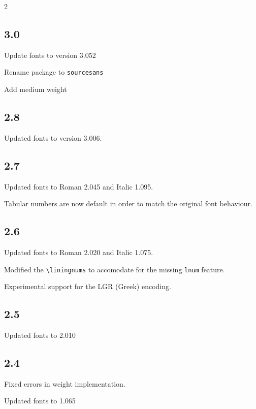\documentclass[10pt,a4paper,english]{article}
\begin{document}
\begin{multicols}{2}
\subsection*{3.0}
\begin{itemize*}
	\item Update fonts to version 3.052
	\item Rename package to \texttt{sourcesans}
	\item Add medium weight
\end{itemize*}

\subsection*{2.8}
\begin{itemize*}
	\item Updated fonts to version 3.006.
\end{itemize*}

\subsection*{2.7}
\begin{itemize*}
	\item Updated fonts to Roman 2.045 and Italic 1.095.
	\item Tabular numbers are now default in order to match the original font behaviour.
\end{itemize*}

\subsection*{2.6}
\begin{itemize*}
	\item Updated fonts to Roman 2.020 and Italic 1.075.
	\item Modified the \texttt{\textbackslash liningnums} to accomodate for the missing \texttt{lnum} feature.
	\item Experimental support for the LGR (Greek) encoding.
\end{itemize*}

\subsection*{2.5}
\begin{itemize*}
	\item Updated fonts to 2.010
\end{itemize*}

\subsection*{2.4}
\begin{itemize*}
	\item Fixed errors in weight implementation.
	\item Updated fonts to 1.065
\end{itemize*}


\end{multicols}
\end{document}
